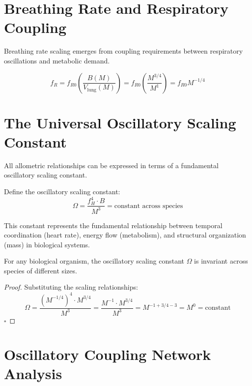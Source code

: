 \documentclass[twocolumn]{article}
\begin{document}
\section{Breathing Rate and Respiratory Coupling}

Breathing rate scaling emerges from coupling requirements between respiratory oscillations and metabolic demand.

\begin{equation}
f_R = f_{R0} \left(\frac{B(M)}{V_{\text{lung}}(M)}\right) = f_{R0} \left(\frac{M^{3/4}}{M^1}\right) = f_{R0} M^{-1/4}
\label{eq:breathing_scaling}
\end{equation}

\section{The Universal Oscillatory Scaling Constant}

All allometric relationships can be expressed in terms of a fundamental oscillatory scaling constant.

\begin{definition}
Define the oscillatory scaling constant:
\begin{equation}
\Omega = \frac{f_H^4 \cdot B}{M^3} = \text{constant across species}
\label{eq:universal_constant}
\end{equation}
\end{definition}

This constant represents the fundamental relationship between temporal coordination (heart rate), energy flow (metabolism), and structural organization (mass) in biological systems.

\begin{theorem}
For any biological organism, the oscillatory scaling constant $\Omega$ is invariant across species of different sizes.
\end{theorem}

\begin{proof}
Substituting the scaling relationships:
\begin{equation}
\Omega = \frac{(M^{-1/4})^4 \cdot M^{3/4}}{M^3} = \frac{M^{-1} \cdot M^{3/4}}{M^3} = M^{-1+3/4-3} = M^0 = \text{constant}
\end{equation}
$\square$
\end{proof}

\section{Oscillatory Coupling Network Analysis}
\end{document}
